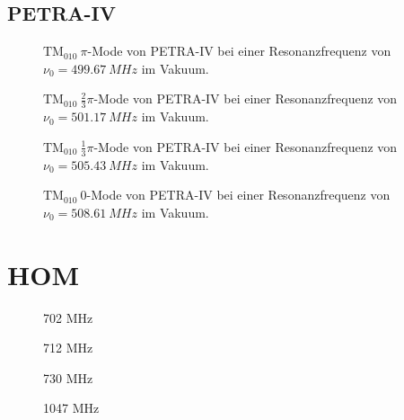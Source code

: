 \subsection{PETRA-IV}
\FloatBarrier
\begin{figure}[h]
  \centering
  
  \caption{$\mathrm{TM}_{010}~\pi$-Mode von PETRA-IV bei einer Resonanzfrequenz von $\nu_0 = \SI{499.67}{MHz}$ im Vakuum.}
\end{figure}

\begin{figure}[h]
  \centering
  
  \caption{$\mathrm{TM}_{010}~\frac{2}{3}\pi$-Mode von PETRA-IV bei einer Resonanzfrequenz von $\nu_0 = \SI{501.17}{MHz}$ im Vakuum.}
\end{figure}

\begin{figure}[h]
  \centering
  
  \caption{$\mathrm{TM}_{010}~\frac{1}{3}\pi$-Mode von PETRA-IV bei einer Resonanzfrequenz von $\nu_0 = \SI{505.43}{MHz}$ im Vakuum.}
\end{figure}

\begin{figure}[h]
  \centering
  
  \caption{$\mathrm{TM}_{010}~0$-Mode von PETRA-IV bei einer Resonanzfrequenz von $\nu_0 = \SI{508.61}{MHz}$ im Vakuum.}
\end{figure}
\FloatBarrier

\section{HOM}
\label{app:hom_felder}
\FloatBarrier

\begin{figure}[h]
  \centering
  
  \caption{702 MHz}
\end{figure}

\begin{figure}[h]
  \centering
  
  \caption{712 MHz}
\end{figure}

\begin{figure}[h]
  \centering
  
  \caption{730 MHz}
\end{figure}

\begin{figure}[h]
  \centering
  
  \caption{1047 MHz}
\end{figure}

